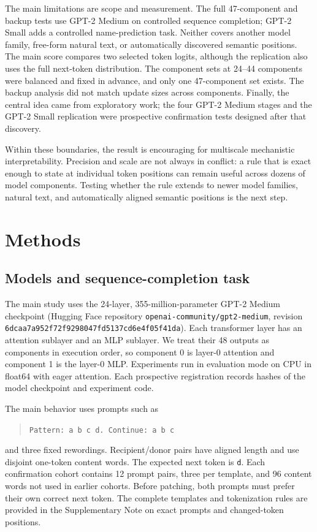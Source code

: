 \documentclass[pdflatex,sn-nature]{sn-jnl}
\begin{document}
The main limitations are scope and measurement. The full 47-component and
backup tests use GPT-2 Medium on controlled sequence completion; GPT-2 Small
adds a controlled name-prediction task. Neither covers another model family,
free-form natural text, or automatically discovered semantic positions. The
main score compares two selected token logits, although the replication also
uses the full next-token distribution. The component sets at 24--44
components were balanced and fixed in advance, and only one 47-component set
exists. The backup analysis did not match update sizes across components.
Finally, the central idea came from exploratory work; the four GPT-2 Medium
stages and the GPT-2 Small replication were prospective confirmation tests
designed after that discovery.

Within these boundaries, the result is encouraging for multiscale mechanistic
interpretability. Precision and scale are not always in conflict: a rule that
is exact enough to state at individual token positions can remain useful
across dozens of model components. Testing whether the rule extends to newer
model families, natural text, and automatically aligned semantic positions is
the next step.

\section{Methods}\label{sec:methods}

\subsection{Models and sequence-completion task}

The main study uses the 24-layer, 355-million-parameter GPT-2 Medium checkpoint
\citep{radford2019language}
(Hugging Face repository \texttt{openai-community/gpt2-medium}, revision
\texttt{6dcaa7a952f72f9298047fd5137cd6e4f05f41da}). Each transformer layer has
an attention sublayer and an MLP sublayer. We treat their 48 outputs as
components in execution order, so component 0 is layer-0 attention and
component 1 is the layer-0 MLP. Experiments run in evaluation mode on CPU in
float64 with eager attention. Each prospective registration records hashes of the model
checkpoint and experiment code.

The main behavior uses prompts such as
\begin{quote}
\small\texttt{Pattern: a b c d. Continue: a b c}
\end{quote}
and three fixed rewordings. Recipient/donor pairs have aligned length and use
disjoint one-token content words. The expected next token is \texttt{d}. Each
confirmation cohort contains 12 prompt pairs, three per template, and 96
content words not used in earlier cohorts. Before patching, both prompts must
prefer their own correct next token. The complete templates and tokenization
rules are provided in the Supplementary Note on exact prompts and changed-token
positions.
\end{document}
